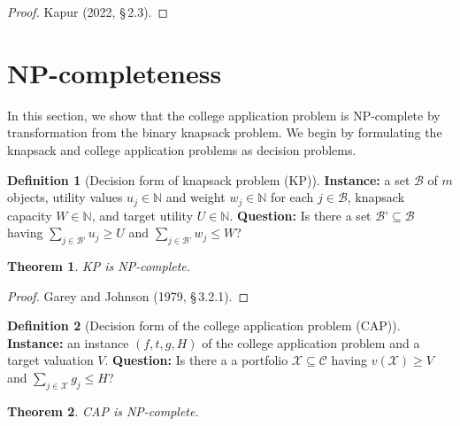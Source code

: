 \documentclass[11pt]{article} %
\newtheorem{theorem}{Theorem}
\theoremstyle{definition}
\newtheorem{definition}{Definition}
\begin{document}
\begin{proof}
Kapur (2022, \S\,2.3). 
\end{proof}








\section{NP-completeness} \label{sectionNPC}

In this section, we show that the college application problem is NP-complete by transformation from the binary knapsack problem. We begin by formulating the knapsack and college application problems as decision problems. 

\begin{definition}[Decision form of knapsack problem (KP)]
\textbf{Instance:} a set $\mathcal{B}$ of $m$ objects, utility values $u_j \in \mathbb{N}$ and weight $w_j \in \mathbb{N}$ for each $j \in \mathcal{B}$, knapsack capacity $W\in \mathbb{N}$, and target utility $U\in \mathbb{N}$. \textbf{Question:} Is there a set $\mathcal{B’} \subseteq \mathcal{B}$ having $\sum_{j \in \mathcal{B’}} u_j \geq U$ and  $\sum_{j \in \mathcal{B’}} w_j \leq W$?
\end{definition}

\begin{theorem} 
KP is NP-complete. 
\end{theorem}

\begin{proof}Garey and Johnson (1979, \S\,3.2.1).\end{proof}

\begin{definition}[Decision form of the college application problem (CAP)] \label{ellisdecisionform}
\textbf{Instance:} an instance $(f, t, g, H)$ of the college application problem and a target valuation $V$. \textbf{Question:} Is there a a portfolio $\mathcal{X} \subseteq \mathcal{C}$ having $v(\mathcal{X}) \geq V$ and  $\sum_{j \in \mathcal{X}} g_j \leq H$?
\end{definition}

\begin{theorem}
CAP is NP-complete.
\end{theorem}
\end{document}
